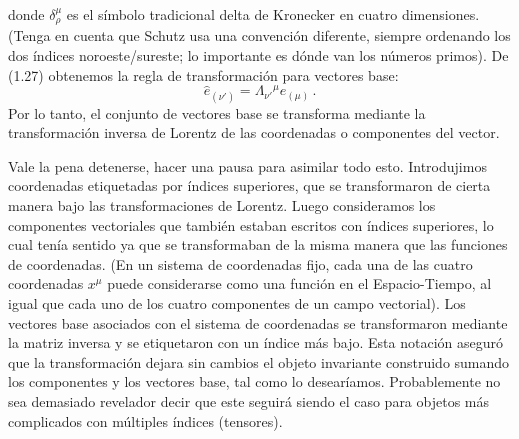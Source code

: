 \documentclass[11pt,b5paper,openany,twoside]{book}
\newcommand{\e}[1]{\hat{e}_{(#1)}}
\begin{document}
donde $\delta^{\mu}_{\rho}$ es el símbolo tradicional delta de Kronecker en cuatro dimensiones.
(Tenga en cuenta que Schutz usa una convención diferente, siempre ordenando los dos índices noroeste/sureste; lo importante es dónde van los números primos).
De (1.27) obtenemos la regla de transformación para vectores base:
\begin{equation}
\e{\nu'} = \Lambda_{\nu'}{}^\mu\e\mu\,.\label{1.30}
\end{equation}
Por lo tanto, el conjunto de vectores base se transforma mediante la transformación inversa de Lorentz de las coordenadas o componentes del vector.

Vale la pena detenerse, hacer una pausa para asimilar todo esto.
Introdujimos coordenadas etiquetadas por índices superiores, que se transformaron de cierta manera bajo las transformaciones de Lorentz.
Luego consideramos los componentes vectoriales que también estaban escritos con índices superiores, lo cual tenía sentido ya que se transformaban de la misma manera que las funciones de coordenadas.
(En un sistema de coordenadas fijo, cada una de las cuatro coordenadas $x^\mu$ puede considerarse como una función en el Espacio-Tiempo, al igual que cada uno de los cuatro componentes de un campo vectorial).
Los vectores base asociados con el sistema de coordenadas se transformaron mediante la matriz inversa y se etiquetaron con un índice más bajo.
Esta notación aseguró que la transformación dejara sin cambios el objeto invariante construido sumando los componentes y los vectores base, tal como lo desearíamos.
Probablemente no sea demasiado revelador decir que este seguirá siendo el caso para objetos más complicados con múltiples índices (tensores).
\end{document}
